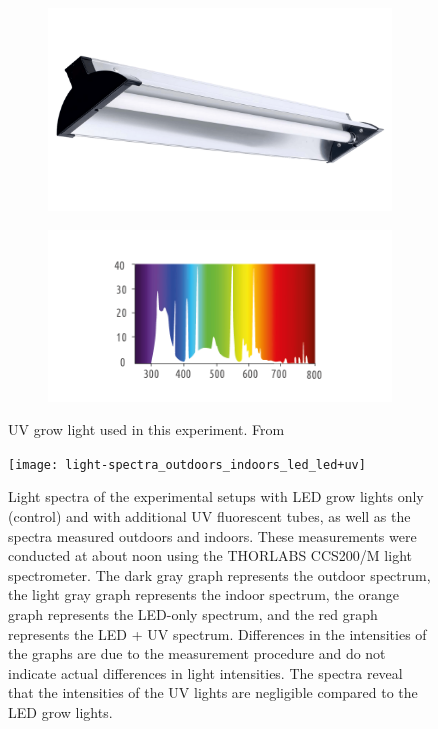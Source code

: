 \begin{figure}[H]
    \begin{subfigure}[t]{.48\textwidth}
        \includegraphics[width=\linewidth]{LuxElite_PlantUV}
        \label{fig:uv_grow_light_img}
    \end{subfigure}
    \hfill
    \begin{subfigure}[t]{.48\textwidth}
        \includegraphics[width=\linewidth]{LuxElite_PlantUV_light-spectrum}
        \label{fig:uv_grow_light_spectrum}
    \end{subfigure}
    \caption[UV grow light used in this experiment]{UV grow light used in this experiment. From }
    \label{fig:uv_grow_light}
\end{figure}

\begin{figure}[H]
    \texttt{[image: light-spectra\_outdoors\_indoors\_led\_led+uv]}
    \caption[Light spectra of the experimental setups and natural conditions]{Light spectra of the experimental setups with LED grow lights only (control) and with additional UV fluorescent tubes, as well as the spectra measured outdoors and indoors. These measurements were conducted at about noon using the THORLABS CCS200/M light spectrometer. The dark gray graph represents the outdoor spectrum, the light gray graph represents the indoor spectrum, the orange graph represents the LED-only spectrum, and the red graph represents the LED + UV spectrum. Differences in the intensities of the graphs are due to the measurement procedure and do not indicate actual differences in light intensities. The spectra reveal that the intensities of the UV lights are negligible compared to the LED grow lights.}
    \label{fig:light-spectra_outdoors_indoors_led_led+uv}
\end{figure}

